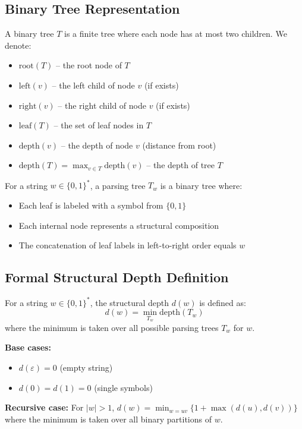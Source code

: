   \subsection{Binary Tree Representation}
  
  \begin{definition}
  A binary tree $T$ is a finite tree where each node has at most two children. We denote:
  \begin{itemize}
  \item $\text{root}(T)$ -- the root node of $T$
  \item $\text{left}(v)$ -- the left child of node $v$ (if exists)
  \item $\text{right}(v)$ -- the right child of node $v$ (if exists)
  \item $\text{leaf}(T)$ -- the set of leaf nodes in $T$
  \item $\text{depth}(v)$ -- the depth of node $v$ (distance from root)
  \item $\text{depth}(T) = \max_{v \in T} \text{depth}(v)$ -- the depth of tree $T$
  \end{itemize}
  \end{definition}
  
  \begin{definition}
  For a string $w \in \{0,1\}^*$, a parsing tree $T_w$ is a binary tree where:
  \begin{itemize}
  \item Each leaf is labeled with a symbol from $\{0,1\}$
  \item Each internal node represents a structural composition
  \item The concatenation of leaf labels in left-to-right order equals $w$
  \end{itemize}
  \end{definition}
  
  \subsection{Formal Structural Depth Definition}
  
  \begin{definition}
  For a string $w \in \{0,1\}^*$, the structural depth $d(w)$ is defined as:
  $$d(w) = \min_{T_w} \text{depth}(T_w)$$
  where the minimum is taken over all possible parsing trees $T_w$ for $w$.
  
  \textbf{Base cases:}
  \begin{itemize}
  \item $d(\varepsilon) = 0$ (empty string)
  \item $d(0) = d(1) = 0$ (single symbols)
  \end{itemize}
  
  \textbf{Recursive case:}
  For $|w| > 1$, $d(w) = \min_{w=uv} \{1 + \max(d(u), d(v))\}$ where the minimum is taken over all binary partitions of $w$.
  \end{definition}
  
